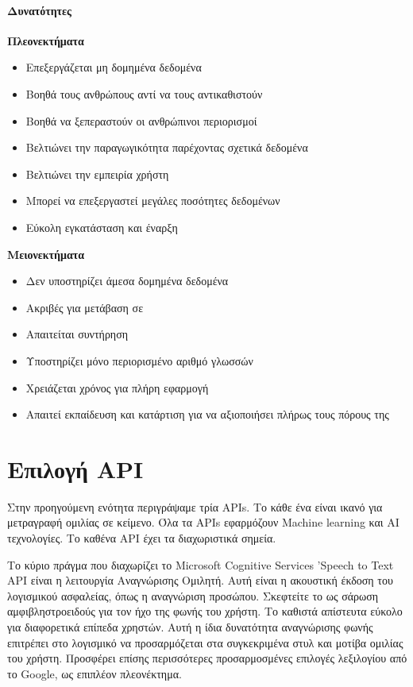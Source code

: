\documentclass[oneside, 12pt]{book}
\begin{document}
\subsubsection{Δυνατότητες}
\textbf{Πλεονεκτήματα}
\begin{itemize}
  \item Επεξεργάζεται μη δομημένα δεδομένα
  \item Βοηθά τους ανθρώπους αντί να τους αντικαθιστούν
  \item Βοηθά να ξεπεραστούν οι ανθρώπινοι περιορισμοί
  \item Βελτιώνει την παραγωγικότητα παρέχοντας σχετικά δεδομένα
  \item Βελτιώνει την εμπειρία χρήστη
  \item Μπορεί να επεξεργαστεί μεγάλες ποσότητες δεδομένων
  \item Εύκολη εγκατάσταση και έναρξη
\end{itemize}
\textbf{Μειονεκτήματα}
\begin{itemize}
  \item Δεν υποστηρίζει άμεσα δομημένα δεδομένα
  \item Ακριβές για μετάβαση σε
  \item Απαιτείται συντήρηση
  \item Υποστηρίζει μόνο περιορισμένο αριθμό γλωσσών
  \item Χρειάζεται χρόνος για πλήρη εφαρμογή
  \item Απαιτεί εκπαίδευση και κατάρτιση για να αξιοποιήσει πλήρως τους πόρους της
\end{itemize}
\chapter{Επιλογή API}
\label{ch:επιλογή-api}
Στην προηγούμενη ενότητα περιγράψαμε τρία APIs. Το κάθε ένα είναι ικανό για μετραγραφή ομιλίας σε
κείμενο.
Όλα τα APIs εφαρμόζουν Machine learning και AI τεχνολογίες.
Το καθένα API έχει τα διαχωριστικά σημεία.

Το κύριο πράγμα που διαχωρίζει το Microsoft Cognitive Services ’Speech to Text API είναι η
λειτουργία Αναγνώρισης Ομιλητή.
Αυτή είναι η ακουστική έκδοση του λογισμικού ασφαλείας, όπως η αναγνώριση προσώπου.
Σκεφτείτε το ως σάρωση αμφιβληστροειδούς για τον ήχο της φωνής του χρήστη.
Το καθιστά απίστευτα εύκολο για διαφορετικά επίπεδα χρηστών.
Αυτή η ίδια δυνατότητα αναγνώρισης φωνής επιτρέπει στο λογισμικό να προσαρμόζεται στα συγκεκριμένα
στυλ και μοτίβα ομιλίας του χρήστη.
Προσφέρει επίσης περισσότερες προσαρμοσμένες επιλογές λεξιλογίου από το Google, ως επιπλέον
πλεονέκτημα.
\end{document}
